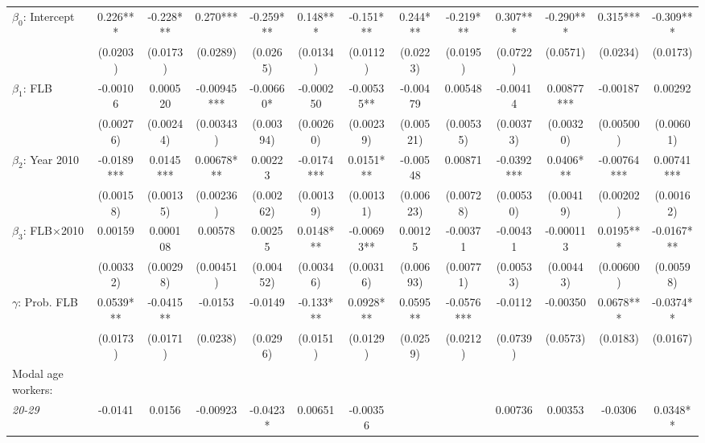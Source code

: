{\begin{threeparttable}
\begin{tabular}{l*{12}{S}}
\midrule
$\beta_0$: Intercept             &       0.226***    & -0.228***   & 0.270***     & -0.259***  & 0.148***   & -0.151***   & 0.244***    & -0.219***  & 0.307***   & -0.290***  & 0.315***     & -0.309***  \\
                                &       (0.0203)    & (0.0173)    & (0.0289)     & (0.0265)   & (0.0134)   & (0.0112)    & (0.0223)    & (0.0195)   & (0.0722)   & (0.0571)   & (0.0234)     & (0.0173)   \\[1ex]
$\beta_1$: FLB                  &       -0.00106    & 0.000520    & -0.00945***  & -0.00660*  & -0.000250  & -0.00535**  & -0.00479    & 0.00548    & -0.00414   & 0.00877*** & -0.00187     & 0.00292    \\
                                &       (0.00276)   & (0.00244)   & (0.00343)    & (0.00394)  & (0.00260)  & (0.00239)   & (0.00521)   & (0.00535)  & (0.00373)  & (0.00320)  & (0.00500)    & (0.00601)  \\[1ex]
$\beta_2$: Year 2010            &       -0.0189***  & 0.0145***   & 0.00678***   & 0.00223    & -0.0174*** & 0.0151***   & -0.00548    & 0.00871    & -0.0392*** & 0.0406***  & -0.00764***  & 0.00741*** \\
                                &       (0.00158)   & (0.00135)   & (0.00236)    & (0.00262)  & (0.00139)  & (0.00131)   & (0.00623)   & (0.00728)  & (0.00530)  & (0.00419)  & (0.00202)    & (0.00162)  \\[1ex]
$\beta_3$: FLB$\times$2010      &       0.00159     & 0.000108    & 0.00578      & 0.00255    & 0.0148***  & -0.00693**  & 0.00125     & -0.00371   & -0.00431   & -0.000113  & 0.0195***    & -0.0167*** \\
                                &       (0.00332)   & (0.00298)   & (0.00451)    & (0.00452)  & (0.00346)  & (0.00316)   & (0.00693)   & (0.00771)  & (0.00533)  & (0.00443)  & (0.00600)    & (0.00598)  \\[1ex]
$\gamma$: Prob. FLB              &       0.0539***   & -0.0415**   & -0.0153      & -0.0149    & -0.133***  & 0.0928***   & 0.0595**    & -0.0576*** & -0.0112    & -0.00350   & 0.0678***    & -0.0374**  \\
                                &       (0.0173)    & (0.0171)    & (0.0238)     & (0.0296)   & (0.0151)   & (0.0129)    & (0.0259)    & (0.0212)   & (0.0739)   & (0.0573)   & (0.0183)     & (0.0167)   \\[1ex]
\cmidrule(lr){1-13}
Modal age workers:             \\[1ex]
\quad \textit{20-29}            &       -0.0141     & 0.0156      & -0.00923     & -0.0423*   & 0.00651    & -0.00356    &             &            & 0.00736    & 0.00353    & -0.0306      & 0.0348**   \\

\end{tabular}
\end{threeparttable}}
